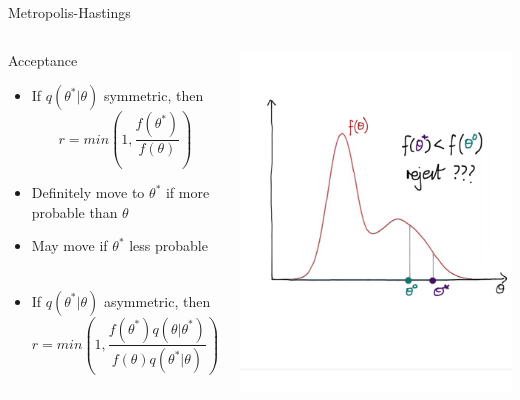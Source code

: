 \documentclass[compress]{beamer}
\begin{document}
\begin{frame}[label=sec-7-8]{Metropolis-Hastings}
\begin{columns}[c] 
\begin{block}{Acceptance}
\begin{itemize}
\item If $q(\theta^*|\theta)$ symmetric, then 
$$ r = min \left( 1,\dfrac{f(\theta^*)}{f(\theta)} \right)$$ 
\item Definitely move to $\theta^*$ if more probable than $\theta$ 
\item May move if $\theta^*$ less probable \\~\\
\item If $q(\theta^*|\theta)$ asymmetric, then $$ r = min \left( 1,\dfrac{f(\theta^*)q(\theta|\theta^*)}{f(\theta)q(\theta^*|\theta)} \right)$$
\end{itemize}
\end{block}

\includegraphics[width=1\linewidth]{MH4}
\end{columns}
\end{frame}
\end{document}
